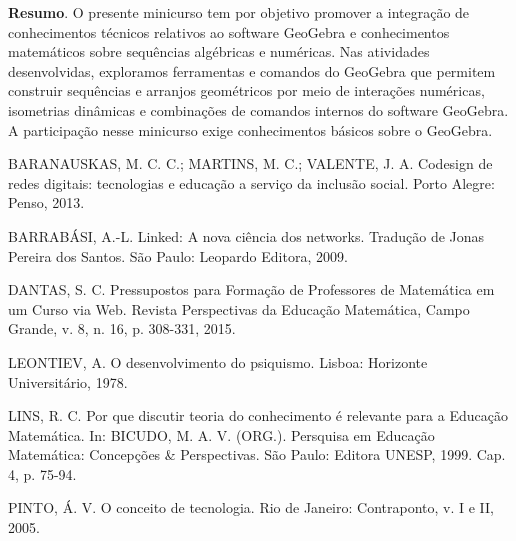	\vspace{24pt}

	
	
	
	\noindent\textbf{Resumo}.\label{scd} 
	O presente minicurso tem por objetivo promover a integração de conhecimentos técnicos relativos ao software GeoGebra e conhecimentos matemáticos sobre sequências algébricas e numéricas. Nas atividades desenvolvidas, exploramos ferramentas e comandos do GeoGebra que permitem construir sequências e arranjos geométricos por meio de interações numéricas, isometrias dinâmicas e combinações de comandos internos do software GeoGebra. A participação nesse minicurso exige conhecimentos básicos sobre o GeoGebra.
	
	\begin{thebibliography}{999}
		\bibitem{} BARANAUSKAS, M. C. C.; MARTINS, M. C.; VALENTE, J. A. Codesign de redes digitais: tecnologias e educação a serviço da inclusão social. Porto Alegre: Penso, 2013. 
		
		\bibitem{} BARRABÁSI, A.-L. Linked: A nova ciência dos networks. Tradução de Jonas Pereira dos Santos. São Paulo: Leopardo Editora, 2009.
		
		\bibitem{} DANTAS, S. C. Pressupostos para Formação de Professores de Matemática em um Curso via Web. Revista Perspectivas da Educação Matemática, Campo Grande, v. 8, n. 16, p. 308-331, 2015.
		
		\bibitem{} LEONTIEV, A. O desenvolvimento do psiquismo. Lisboa: Horizonte Universitário, 1978.
		
		\bibitem{} LINS, R. C. Por que discutir teoria do conhecimento é relevante para a Educação Matemática. In: BICUDO, M. A. V. (ORG.). Persquisa em Educação Matemática: Concepções \& Perspectivas. São Paulo: Editora UNESP, 1999. Cap. 4, p. 75-94.
		
		\bibitem{} PINTO, Á. V. O conceito de tecnologia. Rio de Janeiro: Contraponto, v. I e II, 2005.
	\end{thebibliography}
	\vspace{24pt}
	


\clearpage	